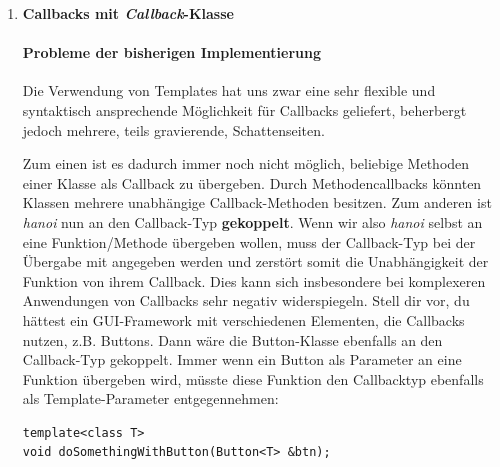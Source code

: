 \begin{enumerate}
Dadurch kann an \emph{hanoi()} fast alles übergeben werden, was sich syntaktisch mittels
\begin{lstlisting}
	callback(a, c);
\end{lstlisting}
aufrufen lässt, also auch Objekte, bei denen der $()$ Operator überladen ist (sog. \emph{Functors}\footnote{\url{https://de.wikipedia.org/wiki/Funktionsobjekt}}).
Dabei müssen nicht einmal die Parametertypen (\emph{int}) exakt übereinstimmen, solange eine implizite Umwandlung durch den Compiler möglich ist. \\

Teste deine Implementierung mit einem Functor.
Schreibe dafür eine einfache Klasse und überlade deren \emph{operator()}:
\begin{lstlisting}
	void operator()(int from, int to);
\end{lstlisting}

\item \textbf{Callbacks mit \emph{Callback}-Klasse}

\paragraph*{Probleme der bisherigen Implementierung}
Die Verwendung von Templates hat uns zwar eine sehr flexible und syntaktisch ansprechende Möglichkeit für Callbacks geliefert, beherbergt jedoch mehrere, teils gravierende, Schattenseiten.

Zum einen ist es dadurch immer noch nicht möglich, beliebige Methoden einer Klasse als Callback zu übergeben.
Durch Methodencallbacks könnten Klassen mehrere unabhängige Callback-Methoden besitzen.
Zum anderen ist \emph{hanoi} nun an den Callback-Typ \textbf{gekoppelt}. Wenn wir also \emph{hanoi} selbst an eine Funktion/Methode übergeben wollen, muss der Callback-Typ bei der Übergabe mit angegeben werden und zerstört somit die Unabhängigkeit der Funktion von ihrem Callback.
Dies kann sich insbesondere bei komplexeren Anwendungen von Callbacks sehr negativ widerspiegeln.
Stell dir vor, du hättest ein GUI-Framework mit verschiedenen Elementen, die Callbacks nutzen, z.B. Buttons.
Dann wäre die Button-Klasse ebenfalls an den Callback-Typ gekoppelt.
Immer wenn ein Button als Parameter an eine Funktion übergeben wird, müsste diese Funktion den Callbacktyp ebenfalls als Template-Parameter entgegennehmen:

\begin{lstlisting}
template<class T>
void doSomethingWithButton(Button<T> &btn);
\end{lstlisting}


\end{enumerate}
